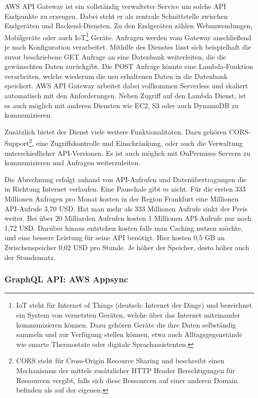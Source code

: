 AWS API Gateway ist ein vollständig verwalteter Service um solche API Endpunkte zu erzeugen.
Dabei steht er als zentrale Schnittstelle zwischen Endgeräten und Backend-Diensten. Zu den Endgeräten zählen Webanwendungen, Mobilgeräte oder auch
IoT\footnote{IoT steht für Internet of Things (deutsch: Internet der Dinge) und bezeichnet ein System von vernetzten Geräten, welche
 über das Internet miteinander kommunizieren können. Dazu gehören Geräte die ihre Daten selbständig sammeln und zur Verfügung stellen können,
 etwa auch Alltagsgegenstände wie smarte Thermostate oder digitale Sprachassistenten. } Geräte.
Anfragen werden vom Gateway anschließend je nach Konfiguration verarbeitet.
Mithilfe des Dienstes lässt sich beispielhaft die zuvor beschriebene GET Anfrage an eine Datenbank weiterleiten, die die gewünschten Daten zurückgibt.
Die POST Anfrage könnte eine Lambda-Funktion verarbeiten, welche wiederum die neu erhaltenen Daten in die Datenbank speichert.
AWS API Gateway arbeitet dabei vollkommen Serverless und skaliert automatisch mit den Anforderungen. Neben Zugriff auf den Lambda Dienst, ist es auch möglich
mit anderen Diensten wie EC2, S3 oder auch DynamoDB zu kommunizieren.

Zusätzlich bietet der Dienst viele weitere Funktionalitäten. Dazu gehören CORS-Support\footnote{CORS steht für Cross-Origin Resource Sharing und
beschreibt einen Mechanismus der mittels zusätzlicher HTTP Header Berechtigungen für Ressourcen vergibt, falls sich diese Ressourcen auf einer anderen
Domain befinden als auf der eigenen.}, eine Zugriffskontrolle und Einschränkung, oder auch die Verwaltung unterschiedlicher
API-Versionen. Es ist auch möglich mit OnPremises Servern zu kommunizieren und Anfragen weiterzuleiten.\cite[]{APIGateway}

Die Abrechnung erfolgt anhand von API-Aufrufen und Datenübertragungen die in Richtung Internet verlaufen. Eine Pauschale gibt es nicht.
Für die ersten 333 Millionen Anfragen pro Monat kosten in der Region Frankfurt eine Millionen API-Aufrufe 3,70 USD. Hat man mehr als 333 Millionen
Aufrufe sinkt der Preis weiter. Bei über 20 Milliarden Aufrufen kosten 1 Millionen API-Aufrufe nur noch 1,72 USD.
Darüber hinaus entstehen kosten falls man Caching nutzen möchte, und eine bessere Leistung für seine API benötigt. Hier kosten 0,5 GB an Zwischenspeicher
0,02 USD pro Stunde. Je höher der Speicher, desto höher auch der Stundensatz.
\cite[]{APIGWPrice}

\subsubsection{GraphQL API: AWS Appsync}

